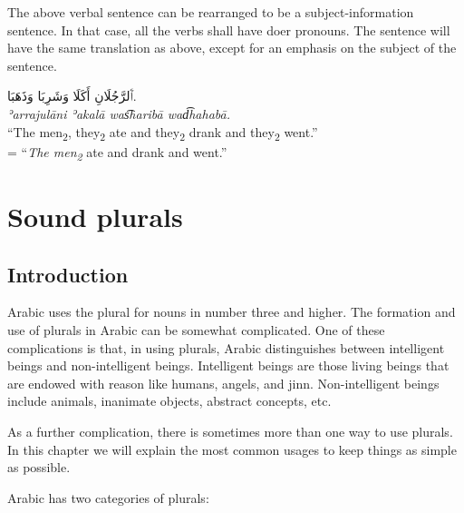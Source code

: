 \documentclass[
  10pt,
]{book}
\begin{document}
The above verbal sentence can be rearranged to be a subject-information sentence. In that case, all the verbs shall have doer pronouns. The sentence will have the same translation as above, except for an emphasis on the subject of the sentence.

\foreignlanguage{arabic}{ٱَلرَّجُلَانِ أَکَلَا وَشَرِبَا وَذَهَبَا.}\\
\emph{ʾarrajulāni ʾakalā was͡haribā wad͡hahabā.}\\
\enquote{The men\textsubscript{2}, they\textsubscript{2} ate and they\textsubscript{2} drank and they\textsubscript{2} went.}\\
= \enquote{\emph{The men\textsubscript{2}} ate and drank and went.}

\chapter{Sound plurals}\label{sound-plurals}

\section{Introduction}\label{introduction-8}

Arabic uses the plural for nouns in number three and higher. The formation and use of plurals in Arabic can be somewhat complicated. One of these complications is that, in using plurals, Arabic distinguishes between intelligent beings and non-intelligent beings. Intelligent beings are those living beings that are endowed with reason like humans, angels, and jinn. Non-intelligent beings include animals, inanimate objects, abstract concepts, etc.

As a further complication, there is sometimes more than one way to use plurals. In this chapter we will explain the most common usages to keep things as simple as possible.

Arabic has two categories of plurals:
\end{document}
